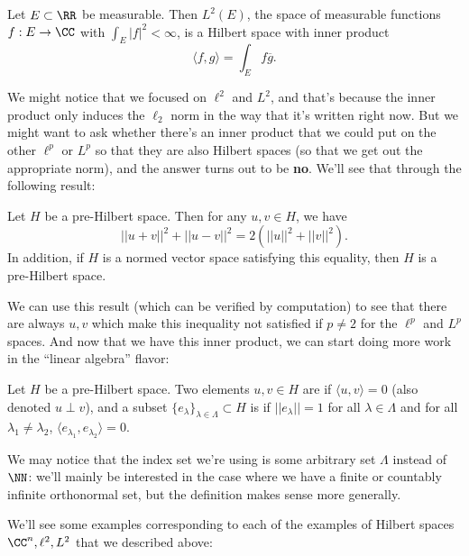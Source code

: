 \begin{example}
Let $E \subset \RR$ be measurable. Then $L^2(E)$, the space of measurable functions $f: E \to \CC$ with $\int_E |f|^2 < \infty$, is a Hilbert space with inner product 
\[
    \langle f, g \rangle = \int_E f\overline{g}.
\]
\end{example}

We might notice that we focused on $\ell^2$ and $L^2$, and that's because the inner product only induces the $\ell_2$ norm in the way that it's written right now. But we might want to ask whether there's an inner product that we could put on the other $\ell^p$ or $L^p$ so that they are also Hilbert spaces (so that we get out the appropriate norm), and the answer turns out to be \textbf{no}. We'll see that through the following result:

\begin{proposition}
Let $H$ be a pre-Hilbert space. Then for any $u, v \in H$, we have
\[
    ||u+v||^2 + ||u-v||^2 = 2\left(||u||^2 + ||v||^2\right).
\]
In addition, if $H$ is a normed vector space satisfying this equality, then $H$ is a pre-Hilbert space.
\end{proposition}

We can use this result (which can be verified by computation) to see that there are always $u, v$ which make this inequality not satisfied if $p \ne 2$ for the $\ell^p$ and $L^p$ spaces. And now that we have this inner product, we can start doing more work in the ``linear algebra'' flavor:

\begin{definition}
Let $H$ be a pre-Hilbert space. Two elements $u, v \in H$ are  if $\langle u, v \rangle = 0$ (also denoted $u \perp v$), and a subset $\{e_{\lambda}\}_{\lambda \in \Lambda} \subset H$ is  if $||e_{\lambda}|| = 1$ for all $\lambda \in \Lambda$ and for all $\lambda_1 \ne \lambda_2$, $\langle e_{\lambda_1}, e_{\lambda_2}\rangle = 0$.
\end{definition}

\begin{remark}
We may notice that the index set we're using is some arbitrary set $\Lambda$ instead of $\NN$: we'll mainly be interested in the case where we have a finite or countably infinite orthonormal set, but the definition makes sense more generally.
\end{remark}

We'll see some examples corresponding to each of the examples of Hilbert spaces $\CC^n, \ell^2, L^2$ that we described above:

